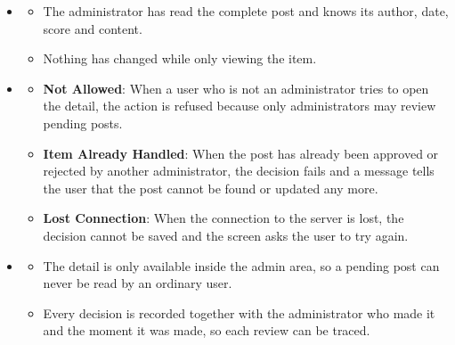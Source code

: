\begin{itemize}[leftmargin=1.6em,topsep=4pt,itemsep=3pt,parsep=0pt,label=$\bullet$]
\begin{itemize}[leftmargin=2.2em,topsep=2pt,itemsep=3pt,parsep=0pt,label=$\circ$]
            \item \textbf{Close Without Deciding}: When the user closes the dialog without pressing a button, no decision is recorded and the post stays in the queue.
        \end{itemize}
    \item {}
        \begin{itemize}[leftmargin=2.2em,topsep=2pt,itemsep=3pt,parsep=0pt,label=$\circ$]
            \item The administrator has read the complete post and knows its author, date, score and content.
            \item Nothing has changed while only viewing the item.
        \end{itemize}
    \item {}
        \begin{itemize}[leftmargin=2.2em,topsep=2pt,itemsep=3pt,parsep=0pt,label=$\circ$]
            \item \textbf{Not Allowed}: When a user who is not an administrator tries to open the detail, the action is refused because only administrators may review pending posts.
            \item \textbf{Item Already Handled}: When the post has already been approved or rejected by another administrator, the decision fails and a message tells the user that the post cannot be found or updated any more.
            \item \textbf{Lost Connection}: When the connection to the server is lost, the decision cannot be saved and the screen asks the user to try again.
        \end{itemize}
    \item {}
        \begin{itemize}[leftmargin=2.2em,topsep=2pt,itemsep=3pt,parsep=0pt,label=$\circ$]
            \item The detail is only available inside the admin area, so a pending post can never be read by an ordinary user.
            \item Every decision is recorded together with the administrator who made it and the moment it was made, so each review can be traced.
        \end{itemize}
\end{itemize}


